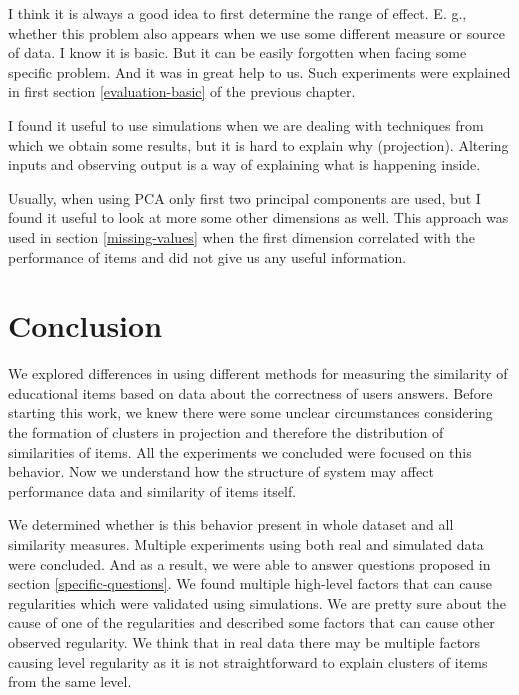 \documentclass[
  digital, %
  table,   %
  nolof,     %
  nolot,     %
  nocover,
  color,
  final, %
]{fithesis3}
\begin{document}

I think it is always a good idea to first determine the range of effect. E. g., whether this problem also appears when we use some different measure or source of data. I know it is basic. But it can be easily forgotten when facing some specific problem. And it was in great help to us. Such experiments were explained in first section \ref{evaluation-basic} of the previous chapter.


I found it useful to use simulations when we are dealing with techniques from which we obtain some results, but it is hard to explain why (projection). Altering inputs and observing output is a way of explaining what is happening inside.


Usually, when using PCA only first two principal components are used, but I found it useful to look at more some other dimensions as well. This approach was used in section \ref{missing-values} when the first dimension correlated with the performance of items and did not give us any useful information.


\chapter{Conclusion}


We explored differences in using different methods for measuring the similarity of educational items based on data about the correctness of users answers. Before starting this work, we knew there were some unclear circumstances considering the formation of clusters in projection and therefore the distribution of similarities of items. All the experiments we concluded were focused on this behavior. Now we understand how the structure of system may affect performance data and similarity of items itself.

We determined whether is this behavior present in whole dataset and all similarity measures. Multiple experiments using both real and simulated data were concluded. And as a result, we were able to answer questions proposed in section \ref{specific-questions}. We found multiple high-level factors that can cause regularities which were validated using simulations. We are pretty sure about the cause of one of the regularities and described some factors that can cause other observed regularity. We think that in real data there may be multiple factors causing level regularity as it is not straightforward to explain clusters of items from the same level.
\end{document}
